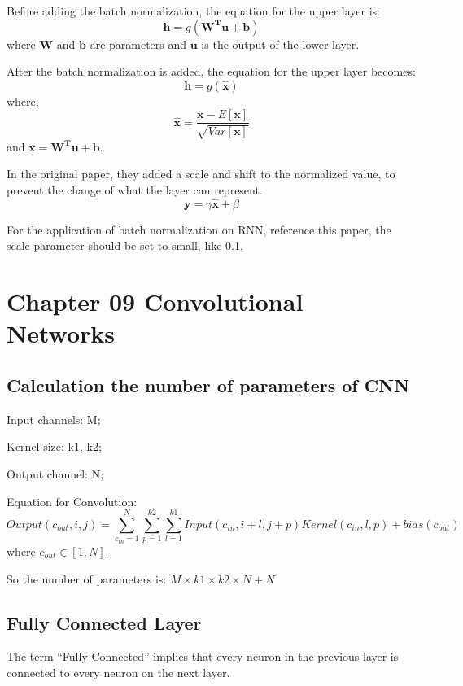 \documentclass[12pt]{article}
\numberwithin{equation}{section}
\begin{document}
	Before adding the batch normalization, the equation for the upper layer is:
	\begin{equation}
		\bm{h}=g(\bm{W^Tu+b})
	\end{equation}
	where $\bm{W}$ and $\bm{b}$ are parameters and $\bm{u}$ is the output of the lower layer.\par
	After the batch normalization is added, the equation for the upper layer becomes:
	\begin{equation}
		\bm{h}=g(\bm{\bm{\hat{x}}})
	\end{equation}
	where, 
	\begin{equation}
		\bm{\hat{x}}=\frac{\bm{x}-E[\bm{x}]}{\sqrt{Var[\bm{x}]}}
	\end{equation}
	and $\bm{x}=\bm{W^Tu+b}$. \par
	In the original paper\citep{ioffe2015batch}, they added a scale and shift to the normalized value, to prevent the change of what the layer can represent. 
	\begin{equation}
		\bm{y}=\gamma \bm{\hat{x}}+\beta
	\end{equation} \par
	For the application of batch normalization on RNN, reference this paper\citep{cooijmans2016recurrent}, the scale parameter should be set to small, like 0.1. \par
\section{Chapter 09 Convolutional Networks}
\subsection{Calculation the number of parameters of CNN} 
Input channels: M; \par
Kernel size: k1, k2; \par
Output channel: N; \par
Equation for Convolution:
\begin{equation}
	Output(c_{out}, i, j) = \sum_{c_{in}=1}^{N}\sum_{p=1}^{k2} \sum_{l=1}^{k1}{Input(c_{in}, i+l, j+p) Kernel(c_{in}, l, p)} + bias(c_{out})
\end{equation}
where $c_{out} \in [1, N]$. \par
So the number of parameters is: $ M \times k1 \times k2 \times N + N$

\subsection{Fully Connected Layer}
The term ``Fully Connected'' implies that every neuron in the previous layer is connected to every neuron on the next layer.
\end{document}
